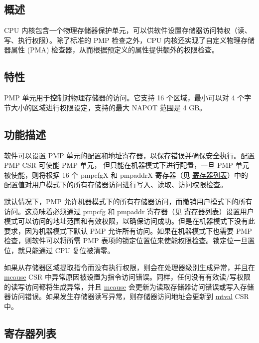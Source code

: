 \documentclass[main\_\_CN.tex]{subfiles}
\begin{document}
\subsection{概述}
\label{sec:riscvcpu-pmp-overview}
CPU 内核包含一个物理存储器保护单元，可以供软件设置存储器访问特权（读、写、执行权限）。除了标准的 PMP 检查之外，CPU 内核还实现了自定义物理存储器属性 (PMA) 检查器，从而根据预定义的属性提供额外的权限检查。

\subsection{特性}
\label{sec:riscvcpu-pmp-features}
PMP 单元用于控制对物理存储器的访问。它支持 16 个区域，最小可以对 4 个字节大小的区域进行权限设定，支持的最大 NAPOT 范围是 4 GB。

\subsection{功能描述}
\label{sec:riscvcpu-pmp-func-descr}

软件可以设置 PMP 单元的配置和地址寄存器，以保存错误并确保安全执行。配置 PMP CSR 可使能 PMP 单元， 但只能在机器模式下进行配置，一旦 PMP 单元被使能，则将根据 16 个 pmpcfgX 和 pmpaddrX 寄存器（见 \hyperref[sec:riscvcpu-pmp-reg-summ]{寄存器列表}）中的配置值对用户模式下的所有存储器访问进行写入、读取、访问权限检查。

默认情况下，PMP 允许机器模式下的所有存储器访问，而撤销用户模式下的所有访问。这意味着必须通过 pmpcfg 和 pmpaddr 寄存器（见 \hyperref[sec:riscvcpu-pmp-reg-summ]{寄存器列表}）设置用户模式可以访问的地址范围和有效权限，以确保访问成功。但是在机器模式下没有此要求，因为机器模式下默认 PMP 允许所有访问。如果在机器模式下也需要 PMP 检查，则软件可以将所需 PMP 表项的锁定位置位来使能权限检查。锁定位一旦置位，就只能通过 CPU 复位被清零。

如果从存储器区域提取指令而没有执行权限，则会在处理器级别生成异常，并且在 \hyperref[regdesc:MCAUSE]{mcause} CSR 中异常原因被设置为指令访问错误。同样，任何没有有效读/写权限的读写访问都将生成异常，并且 \hyperref[regdesc:MCAUSE]{mcause} 会更新为读取存储器访问错误或写入存储器访问错误。如果发生存储器读写异常，则存储器访问地址会更新到 \hyperref[regdesc:MTVAL]{mtval} CSR 中。


\hypertarget{riscvcpu-pmp-reg-summ}{}
\subsection{寄存器列表}
\label{sec:riscvcpu-pmp-reg-summ}
\end{document}
